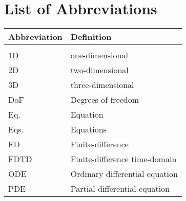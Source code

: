 \chapter{List of Abbreviations}
{\centering\renewcommand{\arraystretch}{1.1}
\begin{longtable}{ p{3cm} p{8cm}}
 Abbreviation & Definition\\
 \hline\\
 \endhead
 1D & one-dimensional\\
 2D & two-dimensional \\
 3D & three-dimensional \\
 DoF & Degrees of freedom \\
 Eq. & Equation \\
 Eqs. & Equations\\
 FD & Finite-difference\\
 FDTD & Finite-difference time-domain\\
 ODE & Ordinary differential equation\\
 PDE & Partial differential equation
\end{longtable}}